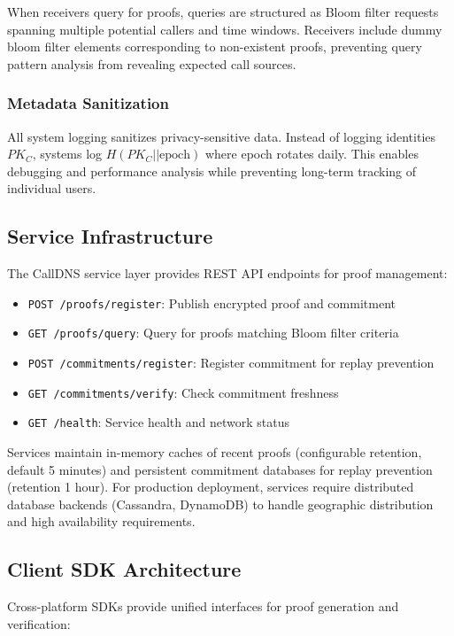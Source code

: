 \documentclass[11pt,twocolumn]{article}
\begin{document}
When receivers query for proofs, queries are structured as Bloom filter requests spanning multiple potential callers and time windows. Receivers include dummy bloom filter elements corresponding to non-existent proofs, preventing query pattern analysis from revealing expected call sources.

\subsubsection{Metadata Sanitization}

All system logging sanitizes privacy-sensitive data. Instead of logging identities $PK_C$, systems log $H(PK_C || \text{epoch})$ where epoch rotates daily. This enables debugging and performance analysis while preventing long-term tracking of individual users.

\subsection{Service Infrastructure}

The CallDNS service layer provides REST API endpoints for proof management:

\begin{itemize}
\item \texttt{POST /proofs/register}: Publish encrypted proof and commitment
\item \texttt{GET /proofs/query}: Query for proofs matching Bloom filter criteria
\item \texttt{POST /commitments/register}: Register commitment for replay prevention
\item \texttt{GET /commitments/verify}: Check commitment freshness
\item \texttt{GET /health}: Service health and network status
\end{itemize}

Services maintain in-memory caches of recent proofs (configurable retention, default 5 minutes) and persistent commitment databases for replay prevention (retention 1 hour). For production deployment, services require distributed database backends (Cassandra, DynamoDB) to handle geographic distribution and high availability requirements.

\subsection{Client SDK Architecture}

Cross-platform SDKs provide unified interfaces for proof generation and verification:
\end{document}
